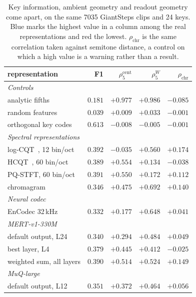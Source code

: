 \begin{table}[t]
\centering
\footnotesize
\setlength{\tabcolsep}{3pt}
\caption{Key information, ambient geometry and readout geometry come apart, on the same 7035 GiantSteps clips and 24 keys. \textcolor{hi}{Blue} marks the highest value in a column among the real representations and \textcolor{lo}{red} the lowest. $\rho_{\text{chr}}$ is the same correlation taken against semitone distance, a control on which a high value is a warning rather than a result.}
\label{tab:decodable-vs-geometric}
\begin{tabular}{l r r r r}
\toprule
representation & F1 & $\rho^{\text{cent}}_{5}$ & $\rho^{W}_{5}$ & $\rho_{\text{chr}}$ \\
\midrule
\multicolumn{5}{l}{\textit{Controls}} \\
\quad analytic fifths & $0.181$ & $+0.977$ & $+0.986$ & $-0.085$ \\
\quad random features & $0.039$ & $+0.009$ & $+0.033$ & $-0.001$ \\
\quad orthogonal key codes & $0.613$ & $-0.008$ & $-0.005$ & $-0.001$ \\
\multicolumn{5}{l}{\textit{Spectral representations}} \\
\quad log-CQT~\cite{brown1991}, 12 bin/oct & $0.392$ & \textcolor{lo}{$\mathbf{-0.035}$} & $+0.560$ & \textcolor{hi}{$\mathbf{+0.174}$} \\
\quad HCQT~\cite{hcqt}, 60 bin/oct & $0.389$ & $+0.554$ & $+0.134$ & $-0.038$ \\
\quad PQ-STFT, 60 bin/oct & $0.391$ & $+0.550$ & $+0.172$ & $+0.112$ \\
\quad chromagram~\cite{librosa} & $0.346$ & $+0.475$ & \textcolor{hi}{$\mathbf{+0.692}$} & $+0.140$ \\
\multicolumn{5}{l}{\textit{Neural codec}} \\
\quad EnCodec 32\,kHz~\cite{encodec} & $0.332$ & $+0.177$ & $+0.648$ & $+0.041$ \\
\multicolumn{5}{l}{\textit{MERT-v1-330M~\cite{mert}}} \\
\quad default output, L24 & $0.340$ & $+0.294$ & $+0.484$ & $+0.049$ \\
\quad best layer, L4 & $0.379$ & $+0.445$ & $+0.412$ & $-0.025$ \\
\quad weighted sum, all layers & $0.390$ & $+0.514$ & $+0.524$ & $+0.149$ \\
\multicolumn{5}{l}{\textit{MuQ-large~\cite{muq}}} \\
\quad default output, L12 & $0.351$ & $+0.372$ & $+0.464$ & $+0.056$ \\

\end{tabular}
\end{table}
